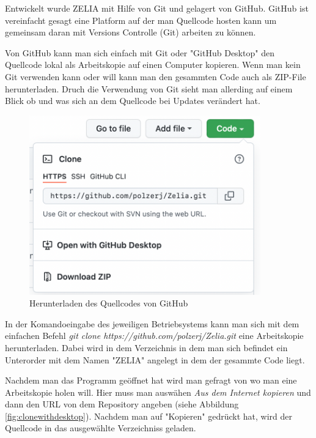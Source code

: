 
Entwickelt wurde ZELIA mit Hilfe von Git und gelagert von GitHub. GitHub ist vereinfacht gesagt eine Platform auf der man Quellcode hosten kann um gemeinsam daran mit Versions Controlle (Git) arbeiten zu können. 

Von GitHub kann man sich einfach mit Git oder "GitHub Desktop" den Quellcode lokal als Arbeitskopie auf einen Computer kopieren. Wenn man kein Git verwenden kann oder will kann man den gesammten Code auch als ZIP-File herunterladen. Druch die Verwendung von Git sieht man allerding auf einem Blick ob und was sich an dem Quellcode bei Updates verändert hat.

\begin{figure}[H]
    \centering
    \includegraphics[width=100mm]{media/Handbuch/GitHub_Download.png}
    \caption{Herunterladen des Quellcodes von GitHub}
\end{figure}


In der Komandoeingabe des jeweiligen Betriebsystems kann man sich mit dem einfachen Befehl \emph{git clone https://github.com/polzerj/Zelia.git} eine Arbeitskopie herunterladen. Dabei wird in dem Verzeichnis in dem man sich befindet ein Unterorder mit dem Namen "ZELIA" angelegt in dem der gesammte Code liegt.


Nachdem man das Programm geöffnet hat wird man gefragt von wo man eine Arbeitskopie holen will. Hier muss man auswähen \emph{Aus dem Internet kopieren} und dann den URL von dem Repository angeben (siehe Abbildung \ref{fig:clonewithdesktop}). Nachdem man auf "Kopieren" gedrückt hat, wird der Quellcode in das ausgewählte Verzeichniss geladen. 

